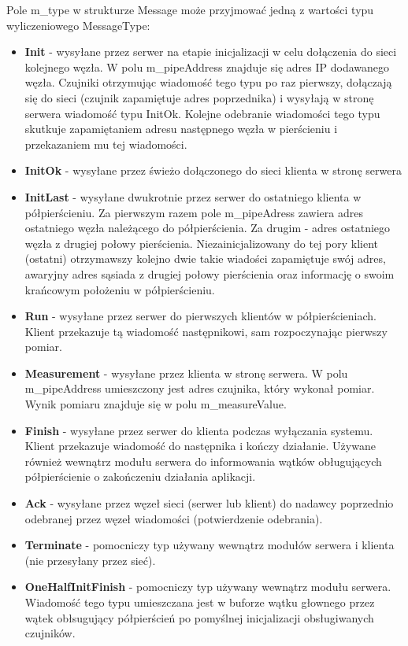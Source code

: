 \documentclass[a4paper,11pt]{article}
\begin{document}
Pole m\_type w strukturze Message może przyjmować jedną z wartości typu wyliczeniowego
MessageType:

\begin{itemize}
\item \textbf{Init} - wysyłane przez serwer na etapie inicjalizacji w celu dołączenia do sieci kolejnego węzła. W polu m\_pipeAddress znajduje się adres IP dodawanego węzła. Czujniki otrzymując wiadomość tego typu po raz pierwszy, dołączają się do sieci (czujnik zapamiętuje adres poprzednika) i wysyłają w stronę serwera wiadomość typu InitOk. Kolejne odebranie wiadomości tego typu skutkuje zapamiętaniem adresu następnego węzła w pierścieniu i przekazaniem mu tej wiadomości.
\item \textbf{InitOk} - wysyłane przez świeżo dołączonego do sieci klienta w stronę serwera
\item \textbf{InitLast} - wysyłane dwukrotnie przez serwer do ostatniego klienta w półpierścieniu. Za pierwszym razem pole m\_pipeAdress zawiera adres ostatniego węzła należącego do półpierścienia. Za drugim - adres ostatniego węzła z drugiej połowy pierścienia. Niezainicjalizowany do tej pory klient (ostatni) otrzymawszy kolejno dwie takie wiadości zapamiętuje swój adres, awaryjny adres sąsiada z drugiej połowy pierścienia oraz informację o swoim krańcowym położeniu w półpierścieniu.
\item \textbf{Run} - wysyłane przez serwer do pierwszych klientów w półpierścieniach. Klient przekazuje tą wiadomość następnikowi, sam rozpoczynając pierwszy pomiar.
\item \textbf{Measurement} - wysyłane przez klienta w stronę serwera. W polu m\_pipeAddress umieszczony jest adres czujnika, który wykonał pomiar. Wynik pomiaru znajduje się w  polu m\_measureValue.
\item \textbf{Finish} - wysyłane przez serwer do klienta podczas wyłączania systemu. Klient przekazuje wiadomość do następnika i kończy działanie. Używane również wewnątrz modułu serwera do informowania wątków obługujących półpierścienie o zakończeniu działania aplikacji.
\item \textbf{Ack} - wysyłane przez węzeł sieci (serwer lub klient) do nadawcy poprzednio odebranej przez węzeł wiadomości (potwierdzenie odebrania).
\item \textbf{Terminate} - pomocniczy typ używany wewnątrz modułów serwera i klienta (nie przesyłany przez sieć).
\item \textbf{OneHalfInitFinish} - pomocniczy typ używany wewnątrz modułu serwera. Wiadomość tego typu umieszczana jest w buforze wątku głownego przez wątek obłsugujący półpierścień po pomyślnej inicjalizacji obsługiwanych czujników.
\end{itemize}
\end{document}
